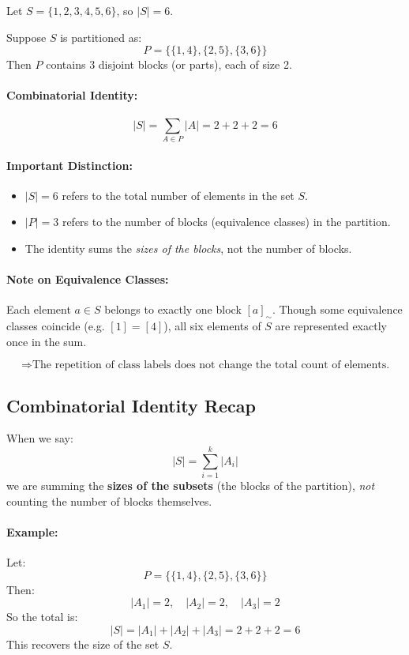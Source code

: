 \documentclass[10pt]{article}
\theoremstyle{plain}
\theoremstyle{definition}
\begin{document}
	Let $S = \{1, 2, 3, 4, 5, 6\}$, so $|S| = 6$.
	
	Suppose $S$ is partitioned as:
	\[
	P = \{\{1,4\}, \{2,5\}, \{3,6\}\}
	\]
	Then $P$ contains 3 disjoint blocks (or parts), each of size 2.
	
	\paragraph{Combinatorial Identity:}
	\[
	|S| = \sum_{A \in P} |A| = 2 + 2 + 2 = 6
	\]
	
	\paragraph{Important Distinction:}
	\begin{itemize}
		\item $|S| = 6$ refers to the total number of elements in the set $S$.
		\item $|P| = 3$ refers to the number of blocks (equivalence classes) in the partition.
		\item The identity sums the \emph{sizes of the blocks}, not the number of blocks.
	\end{itemize}
	
	\paragraph{Note on Equivalence Classes:}
	Each element $a \in S$ belongs to exactly one block $[a]_\sim$.
	Though some equivalence classes coincide (e.g. $[1] = [4]$), all six elements of $S$ are represented exactly once in the sum.
	
	\[
	\Rightarrow \text{The repetition of class labels does not change the total count of elements.}
	\]
	
	\subsection*{Combinatorial Identity Recap}
	
	When we say:
	\[
	|S| = \sum_{i=1}^{k} |A_i|
	\]
	we are summing the \textbf{sizes of the subsets} (the blocks of the partition), \emph{not} counting the number of blocks themselves.
	
	\paragraph{Example:}
	Let:
	\[
	P = \{\{1,4\}, \{2,5\}, \{3,6\}\}
	\]
	Then:
	\[
	|A_1| = 2, \quad |A_2| = 2, \quad |A_3| = 2
	\]
	So the total is:
	\[
	|S| = |A_1| + |A_2| + |A_3| = 2 + 2 + 2 = 6
	\]
	This recovers the size of the set $S$.
	
\end{document}
